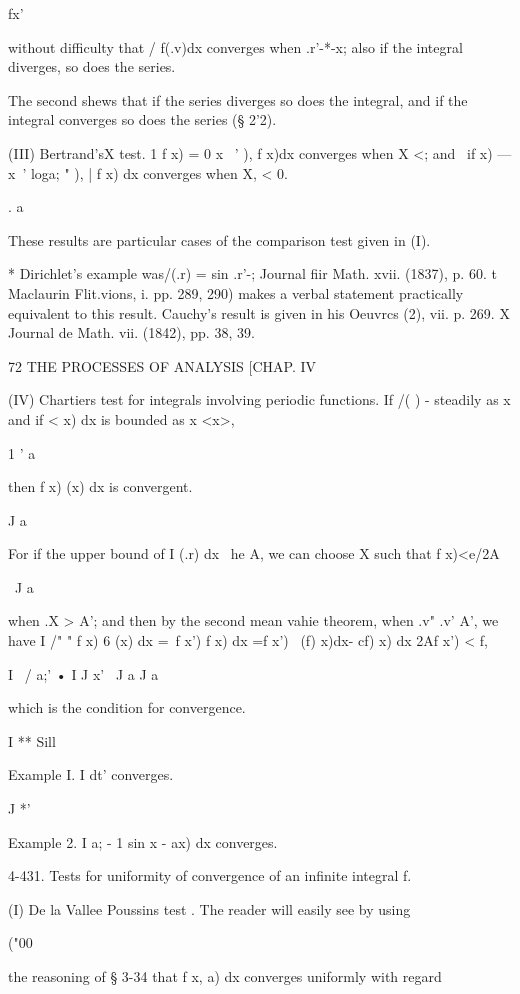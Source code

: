 fx'

without difficulty that / f(.v)dx converges when .r'-*-x; also if the
integral diverges, so does the series.

The second shews that if the series diverges so does the integral, and
if the integral converges so does the series (§ 2'2).

(III) Bertrand'sX test. 1 f x) = 0 x ~' ), f x)dx converges when X <;
and \ if x) — x~' loga; " ), | f x) dx converges when X, < 0.

. a

These results are particular cases of the comparison test given in
(I).

* Dirichlet's example was/(.r) = sin .r'-; Journal fiir Math. xvii.
(1837), p. 60. t Maclaurin Flit.vions, i. pp. 289, 290) makes a verbal
statement practically equivalent to this result. Cauchy's result is
given in his Oeuvrcs (2), vii. p. 269. X Journal de Math. vii. (1842),
pp. 38, 39.



72 THE PROCESSES OF ANALYSIS [CHAP. IV

(IV) Chartiers test for integrals involving periodic functions. If /(
) - steadily as x and if < x) dx is bounded as x <x>,

1 ' a

then f x) (x) dx is convergent.

J a

For if the upper bound of I (.r) dx \ he A, we can choose X such that
f x)<e/2A

\ J a

when .X > A'; and then by the second mean vahie theorem, when .v" .v'
A', we have I /" " f x) 6 (x) dx =\ f x') f x) dx =f x') \ (f) x)dx-
cf) x) dx 2Af x') < f,

I \ / a;' • I J x' \ J a J a

which is the condition for convergence.

I ** Sill

Example I. I dt' converges.

J *'

Example 2. I a; - 1 sin x - ax) dx converges.

4-431. Tests for uniformity of convergence of an infinite integral f.

(I) De la Vallee Poussins test . The reader will easily see by using

("00

the reasoning of § 3-34 that f x, a) dx converges uniformly with
regard

